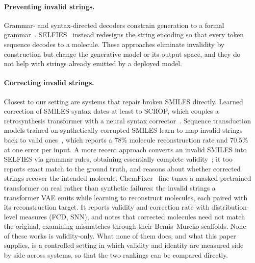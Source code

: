 \documentclass[journal=jcisd8,manuscript=article]{achemso}
\begin{document}
\paragraph{Preventing invalid strings.}
Grammar- and syntax-directed decoders constrain generation to a formal
grammar~\citep{kusner2017grammar,dai2018syntax,geng2023grammar}.
SELFIES~\citep{krenn2020selfies,krenn2022selfies} instead redesigns the string
encoding so that every token sequence decodes to a molecule. These approaches
eliminate invalidity by construction but change the generative model or its
output space, and they do not help with strings already emitted by a deployed
model.

\paragraph{Correcting invalid strings.}
Closest to our setting are systems that repair broken SMILES directly. Learned
correction of SMILES syntax dates at least to SCROP, which couples a
retrosynthesis transformer with a neural syntax corrector~\citep{zheng2020scrop}.
Sequence
transduction models trained on synthetically corrupted SMILES learn to map
invalid strings back to valid ones~\citep{schoenmaker2023uncorrupt}, which
reports a 78\% molecule reconstruction rate and 70.5\% at one error per input.
A more recent approach converts an invalid SMILES into SELFIES via grammar rules,
obtaining essentially complete validity~\citep{smiself2025}; it too reports exact
match to the ground truth, and reasons about whether corrected strings recover the
intended molecule. ChemFixer~\citep{park2026chemfixer} fine-tunes a
masked-pretrained transformer on real rather than synthetic failures: the invalid strings a transformer
VAE emits while learning to reconstruct molecules, each paired with its
reconstruction target. It reports validity and correction rate with
distribution-level measures (FCD, SNN), and notes that corrected molecules need
not match the original, examining mismatches through their Bemis--Murcko
scaffolds. None of these works is
validity-only. What none of them does, and what this
paper supplies, is a controlled setting in which validity and identity are measured
side by side across systems, so that the two rankings can be compared directly.
\end{document}
